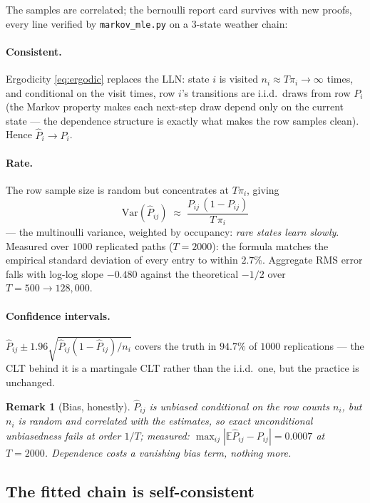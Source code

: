 \documentclass[11pt]{article}
\newtheorem{remark}{Remark}
\begin{document}
The samples are correlated; the bernoulli report card survives with
new proofs, every line verified by \texttt{markov\_mle.py} on a
3-state weather chain:

\paragraph{Consistent.} Ergodicity \eqref{eq:ergodic} replaces the
LLN: state $i$ is visited $n_i \approx T\pi_i \to \infty$ times, and
conditional on the visit times, row $i$'s transitions are i.i.d.\
draws from row $P_i$ (the Markov property makes each next-step draw
depend only on the current state --- the dependence structure is
exactly what makes the row samples clean). Hence
$\hat P_i \to P_i$.

\paragraph{Rate.} The row sample size is random but concentrates at
$T\pi_i$, giving
\begin{equation}
  \mathrm{Var}(\hat P_{ij})
  \;\approx\; \frac{P_{ij}\,(1 - P_{ij})}{T\,\pi_i}
  \label{eq:var}
\end{equation}
--- the multinoulli variance, weighted by occupancy: \emph{rare states
learn slowly}. Measured over $1000$ replicated paths ($T = 2000$):
the formula matches the empirical standard deviation of every entry to
within $2.7\%$. Aggregate RMS error falls with log-log slope $-0.480$
against the theoretical $-1/2$ over $T = 500 \to 128{,}000$.

\paragraph{Confidence intervals.} $\hat P_{ij} \pm 1.96
\sqrt{\hat P_{ij}(1-\hat P_{ij})/n_i}$ covers the truth in $94.7\%$ of
$1000$ replications --- the CLT behind it is a martingale CLT rather
than the i.i.d.\ one, but the practice is unchanged.

\begin{remark}[Bias, honestly]
$\hat P_{ij}$ is unbiased \emph{conditional on the row counts} $n_i$,
but $n_i$ is random and correlated with the estimates, so exact
unconditional unbiasedness fails at order $1/T$; measured:
$\max_{ij} |\mathbb{E}\hat P_{ij} - P_{ij}| = 0.0007$ at $T = 2000$.
Dependence costs a vanishing bias term, nothing more.
\end{remark}

\subsection{The fitted chain is self-consistent}
\end{document}

